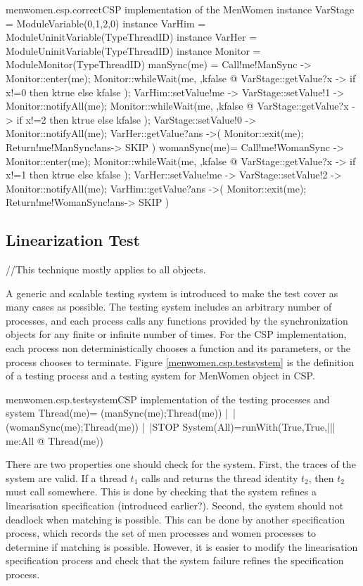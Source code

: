 \documentclass{article}
\begin{document}
\begin{cspfloat}{menwomen.csp.correct}{CSP implementation of the MenWomen}
instance VarStage = ModuleVariable({0,1,2},0) 
instance VarHim = ModuleUninitVariable(TypeThreadID)
instance VarHer = ModuleUninitVariable(TypeThreadID)
instance Monitor = ModuleMonitor(TypeThreadID)
manSync(me) = 
  Call!me!ManSync ->
  Monitor::enter(me);
    Monitor::whileWait(me, \ktrue,kfalse @
      VarStage::getValue?x ->
      if x!=0 then ktrue else kfalse
    );
    VarHim::setValue!me ->
    VarStage::setValue!1 ->
    Monitor::notifyAll(me);
    Monitor::whileWait(me, \ktrue,kfalse @
      VarStage::getValue?x ->
      if x!=2 then ktrue else kfalse
    );
    VarStage::setValue!0 ->
    Monitor::notifyAll(me);
    VarHer::getValue?ans ->(
  Monitor::exit(me);
  Return!me!ManSync!ans->
  SKIP
  )
womanSync(me)=
  Call!me!WomanSync ->
  Monitor::enter(me);
    Monitor::whileWait(me, \ktrue,kfalse @
      VarStage::getValue?x ->
      if x!=1 then ktrue else kfalse
    );
    VarHer::setValue!me ->
    VarStage::setValue!2 ->
    Monitor::notifyAll(me);
    VarHim::getValue?ans ->(
  Monitor::exit(me);
  Return!me!WomanSync!ans->
  SKIP
  )
\end{cspfloat}


\subsection{Linearization Test}
//This technique mostly applies to all objects.


A generic and scalable testing system is introduced to make the test cover as many cases as possible. The testing system includes an arbitrary number of processes, and each process calls any functions provided by the synchronization objects for any finite or infinite number of times. For the CSP implementation, each process non deterministically chooses a function and its parameters, or the process chooses to terminate. Figure \ref{menwomen.csp.testsystem} is the definition of a testing process and a testing system for MenWomen object in CSP.

\begin{cspinline}{menwomen.csp.testsystem}{CSP implementation of the testing processes and system}
Thread(me)=
    (manSync(me);Thread(me))
 |~|(womanSync(me);Thread(me))
 |~|STOP
System(All)=runWith(True,True,||| me:All @ Thread(me))
\end{cspinline}
  
There are two properties one should check for the system. First, the traces of the system are valid. If a thread $t_1$ calls  and returns the thread identity $t_2$, then $t_2$ must call  somewhere. This is done by checking that the system refines a linearisation specification (introduced earlier?). Second, the system should not deadlock when matching is possible. This can be done by another specification process, which records the set of men processes and women processes to determine if matching is possible. However, it is easier to modify the linearisation specification process and check that the system failure refines the specification process.
\end{document}
